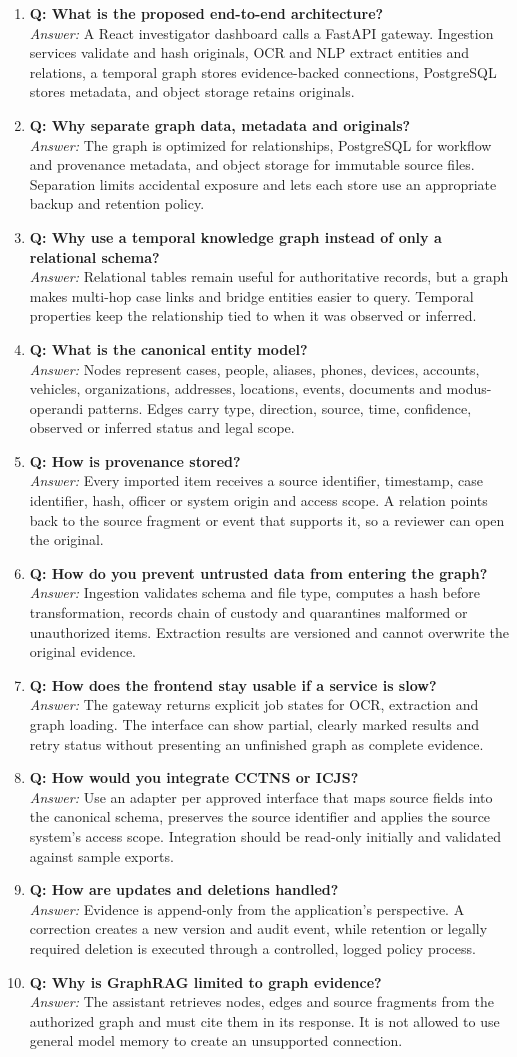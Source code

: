 \documentclass[10pt,a4paper]{article}
\newcommand{\qa}[2]{\item \textbf{\color{navy}Q: #1}\\[-1pt]{\color{coral}\textit{Answer:}} #2}
\begin{document}
\begin{enumerate}
\qa{What is the proposed end-to-end architecture?}{A React investigator dashboard calls a FastAPI gateway. Ingestion services validate and hash originals, OCR and NLP extract entities and relations, a temporal graph stores evidence-backed connections, PostgreSQL stores metadata, and object storage retains originals.}
\qa{Why separate graph data, metadata and originals?}{The graph is optimized for relationships, PostgreSQL for workflow and provenance metadata, and object storage for immutable source files. Separation limits accidental exposure and lets each store use an appropriate backup and retention policy.}
\qa{Why use a temporal knowledge graph instead of only a relational schema?}{Relational tables remain useful for authoritative records, but a graph makes multi-hop case links and bridge entities easier to query. Temporal properties keep the relationship tied to when it was observed or inferred.}
\qa{What is the canonical entity model?}{Nodes represent cases, people, aliases, phones, devices, accounts, vehicles, organizations, addresses, locations, events, documents and modus-operandi patterns. Edges carry type, direction, source, time, confidence, observed or inferred status and legal scope.}
\qa{How is provenance stored?}{Every imported item receives a source identifier, timestamp, case identifier, hash, officer or system origin and access scope. A relation points back to the source fragment or event that supports it, so a reviewer can open the original.}
\qa{How do you prevent untrusted data from entering the graph?}{Ingestion validates schema and file type, computes a hash before transformation, records chain of custody and quarantines malformed or unauthorized items. Extraction results are versioned and cannot overwrite the original evidence.}
\qa{How does the frontend stay usable if a service is slow?}{The gateway returns explicit job states for OCR, extraction and graph loading. The interface can show partial, clearly marked results and retry status without presenting an unfinished graph as complete evidence.}
\qa{How would you integrate CCTNS or ICJS?}{Use an adapter per approved interface that maps source fields into the canonical schema, preserves the source identifier and applies the source system's access scope. Integration should be read-only initially and validated against sample exports.}
\qa{How are updates and deletions handled?}{Evidence is append-only from the application's perspective. A correction creates a new version and audit event, while retention or legally required deletion is executed through a controlled, logged policy process.}
\qa{Why is GraphRAG limited to graph evidence?}{The assistant retrieves nodes, edges and source fragments from the authorized graph and must cite them in its response. It is not allowed to use general model memory to create an unsupported connection.}
\end{enumerate}
\end{document}
